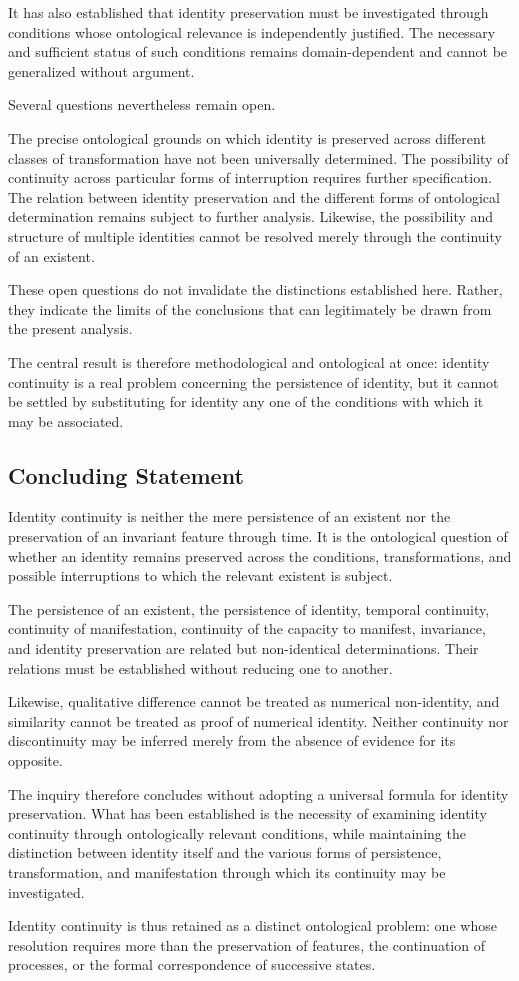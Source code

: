 It has also established that identity preservation must be investigated
through conditions whose ontological relevance is independently justified.
The necessary and sufficient status of such conditions remains domain-dependent
and cannot be generalized without argument.

Several questions nevertheless remain open.

The precise ontological grounds on which identity is preserved across
different classes of transformation have not been universally determined.
The possibility of continuity across particular forms of interruption
requires further specification. The relation between identity preservation
and the different forms of ontological determination remains subject to
further analysis. Likewise, the possibility and structure of multiple
identities cannot be resolved merely through the continuity of an existent.

These open questions do not invalidate the distinctions established here.
Rather, they indicate the limits of the conclusions that can legitimately
be drawn from the present analysis.

The central result is therefore methodological and ontological at once:
identity continuity is a real problem concerning the persistence of
identity, but it cannot be settled by substituting for identity any one
of the conditions with which it may be associated.

\subsection{Concluding Statement}

Identity continuity is neither the mere persistence of an existent nor
the preservation of an invariant feature through time. It is the
ontological question of whether an identity remains preserved across
the conditions, transformations, and possible interruptions to which
the relevant existent is subject.

The persistence of an existent, the persistence of identity, temporal
continuity, continuity of manifestation, continuity of the capacity
to manifest, invariance, and identity preservation are related but
non-identical determinations. Their relations must be established
without reducing one to another.

Likewise, qualitative difference cannot be treated as numerical
non-identity, and similarity cannot be treated as proof of numerical
identity. Neither continuity nor discontinuity may be inferred merely
from the absence of evidence for its opposite.

The inquiry therefore concludes without adopting a universal formula
for identity preservation. What has been established is the necessity
of examining identity continuity through ontologically relevant
conditions, while maintaining the distinction between identity itself
and the various forms of persistence, transformation, and manifestation
through which its continuity may be investigated.

Identity continuity is thus retained as a distinct ontological problem:
one whose resolution requires more than the preservation of features,
the continuation of processes, or the formal correspondence of successive
states.